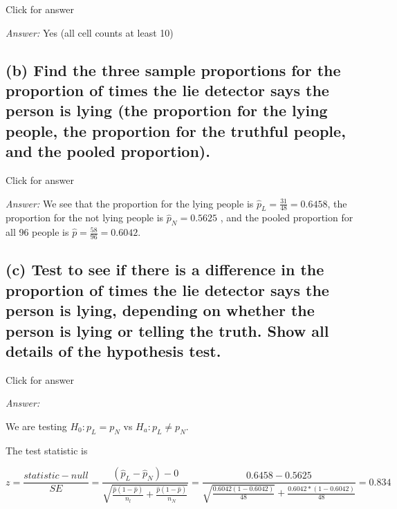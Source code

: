 \documentclass[
]{book}
\begin{document}
Click for answer

\emph{Answer:} Yes (all cell counts at least 10)

\hypertarget{b-find-the-three-sample-proportions-for-the-proportion-of-times-the-lie-detector-says-the-person-is-lying-the-proportion-for-the-lying-people-the-proportion-for-the-truthful-people-and-the-pooled-proportion.}{%
\subsection{(b) Find the three sample proportions for the proportion of times the lie detector says the person is lying (the proportion for the lying people, the proportion for the truthful people, and the pooled proportion).}\label{b-find-the-three-sample-proportions-for-the-proportion-of-times-the-lie-detector-says-the-person-is-lying-the-proportion-for-the-lying-people-the-proportion-for-the-truthful-people-and-the-pooled-proportion.}}

Click for answer

\emph{Answer:} We see that the proportion for the lying people is \(\hat{p}_L = \frac{31}{48}= 0.6458\), the proportion for the not lying people is \(\hat{p}_N = 0.5625\) , and the pooled proportion for all 96 people is \(\hat{p} = \frac{58}{96}= 0.6042\).

\hypertarget{c-test-to-see-if-there-is-a-difference-in-the-proportion-of-times-the-lie-detector-says-the-person-is-lying-depending-on-whether-the-person-is-lying-or-telling-the-truth.-show-all-details-of-the-hypothesis-test.}{%
\subsection{(c) Test to see if there is a difference in the proportion of times the lie detector says the person is lying, depending on whether the person is lying or telling the truth. Show all details of the hypothesis test.}\label{c-test-to-see-if-there-is-a-difference-in-the-proportion-of-times-the-lie-detector-says-the-person-is-lying-depending-on-whether-the-person-is-lying-or-telling-the-truth.-show-all-details-of-the-hypothesis-test.}}

Click for answer

\emph{Answer:}

We are testing \(H_0:p_L = p_N\) vs \(H_a:p_L \neq p_N\).

The test statistic is

\[z = \frac{statistic-null}{SE} = \frac{(\hat{p}_L - \hat{p}_N) - 0}{\sqrt{\frac{\hat{p}(1-\hat{p})}{n_l} + \frac{\hat{p}(1-\hat{p})}{n_N}}} = \frac{0.6458 - 0.5625}{\sqrt{\frac{0.6042(1-0.6042)}{48}} + \frac{0.6042*(1-0.6042)}{48}} = 0.834 \]
\end{document}
